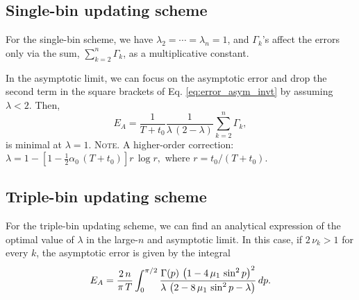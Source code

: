 \documentclass[reprint, floatfix]{revtex4-1}
\newcommand{\note}[1]{{\color{DarkGreen}\footnotesize \textsc{Note.} #1}}
\newcommand{\Err}{E}
\begin{document}
\subsection{\label{sec:invt_singlebin}
  Single-bin updating scheme
}



For the single-bin scheme, we have
$\lambda_2 = \cdots = \lambda_n = 1$,
and
$\Gamma_k$'s affect the errors
only via the sum, $\sum_{k = 2}^n \Gamma_k$,
as a multiplicative constant.

In the asymptotic limit,
we can focus on the asymptotic error
and drop the second term in the square brackets
of Eq. \eqref{eq:error_asym_invt}
by assuming $\lambda < 2$.
%
Then,
$$
  E_A
  =
  \frac { 1 } { T + t_0 }
  \frac {             1            }
        { \lambda \, (2 - \lambda) }
  \sum_{ k = 2 }^n \Gamma_k
  ,
$$
is minimal at $\lambda = 1$.
%
\note{A higher-order correction:
  $
  \lambda = 1 -
  \left[
    1 - \frac 1 2 \alpha_0 \, (T+t_0)
  \right] r \, \log r
  ,
  $
  where $r = t_0 / (T + t_0)$.
}




\subsection{\label{sec:invt_nn}
Triple-bin updating scheme}




For the triple-bin updating scheme,
we can find an analytical expression
of the optimal value of $\lambda$
in the large-$n$ and asymptotic limit.
%
In this case,
if $2 \, \nu_k > 1$ for every $k$,
the asymptotic error is given by the integral
%
\begin{align}
  \Err_A
  =
  \frac{ 2 \, n  }
       { \pi \, T }
  \int_0^{\pi/2}
    \frac{ \Gamma(p) \, \left(1 - 4 \, \mu_1 \, \sin^2 p \right)^2    }
         {   \lambda \, \left(2 - 8 \, \mu_1 \, \sin^2 p - \lambda \right) }
  \, dp
  .
\notag
\end{align}
\end{document}

